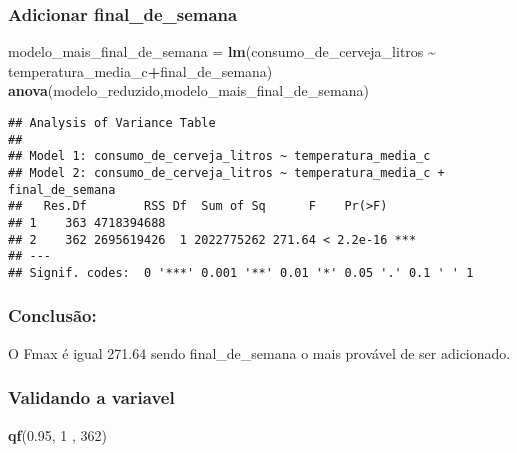 \documentclass[
]{article}
\newenvironment{Shaded}{\begin{snugshade}}{\end{snugshade}}
\newcommand{\DecValTok}[1]{\textcolor[rgb]{0.00,0.00,0.81}{#1}}
\newcommand{\FloatTok}[1]{\textcolor[rgb]{0.00,0.00,0.81}{#1}}
\newcommand{\FunctionTok}[1]{\textcolor[rgb]{0.13,0.29,0.53}{\textbf{#1}}}
\newcommand{\NormalTok}[1]{#1}
\newcommand{\OtherTok}[1]{\textcolor[rgb]{0.56,0.35,0.01}{#1}}
\newcommand{\SpecialCharTok}[1]{\textcolor[rgb]{0.81,0.36,0.00}{\textbf{#1}}}
\begin{document}
\hypertarget{adicionar-final_de_semana}{%
\subsubsection{Adicionar
final\_de\_semana}\label{adicionar-final_de_semana}}

\begin{Shaded}
\begin{Highlighting}[]
\NormalTok{modelo\_mais\_final\_de\_semana }\OtherTok{=} \FunctionTok{lm}\NormalTok{(consumo\_de\_cerveja\_litros }\SpecialCharTok{\textasciitilde{}} 
\NormalTok{                                   temperatura\_media\_c}\SpecialCharTok{+}\NormalTok{final\_de\_semana)}
\FunctionTok{anova}\NormalTok{(modelo\_reduzido,modelo\_mais\_final\_de\_semana)}
\end{Highlighting}
\end{Shaded}

\begin{verbatim}
## Analysis of Variance Table
## 
## Model 1: consumo_de_cerveja_litros ~ temperatura_media_c
## Model 2: consumo_de_cerveja_litros ~ temperatura_media_c + final_de_semana
##   Res.Df        RSS Df  Sum of Sq      F    Pr(>F)    
## 1    363 4718394688                                   
## 2    362 2695619426  1 2022775262 271.64 < 2.2e-16 ***
## ---
## Signif. codes:  0 '***' 0.001 '**' 0.01 '*' 0.05 '.' 0.1 ' ' 1
\end{verbatim}

\hypertarget{conclusuxe3o-3}{%
\subsubsection{Conclusão:}\label{conclusuxe3o-3}}

O Fmax é igual 271.64 sendo final\_de\_semana o mais provável de ser
adicionado.

\hypertarget{validando-a-variavel}{%
\subsubsection{Validando a variavel}\label{validando-a-variavel}}

\begin{Shaded}
\begin{Highlighting}[]
\FunctionTok{qf}\NormalTok{(}\FloatTok{0.95}\NormalTok{, }\DecValTok{1}\NormalTok{ , }\DecValTok{362}\NormalTok{)}
\end{Highlighting}
\end{Shaded}
\end{document}
